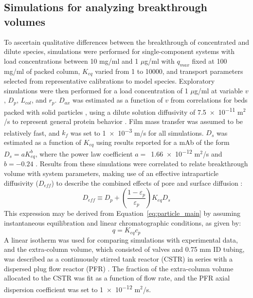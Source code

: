\documentclass[preprint,review,12pt]{elsarticle}
\begin{document}
    \subsection{Simulations for analyzing breakthrough volumes} \label{ssec:sims_explor}
        To ascertain qualitative differences between the breakthrough of concentrated and dilute species, simulations were performed for single-component systems with load concentrations between 10 mg/ml and 1 $\mu$g/ml with $q_{max}$ fixed at  100 mg/ml of packed column, $K_{eq}$ varied from 1 to 10000, and transport parameters selected from representative calibrations to model species. Exploratory simulations were then performed for a load concentration of 1 $\mu$g/ml at variable $v$, $D_p$, $L_{col}$, and $r_p$. $D_{ax}$ was estimated as a function of $v$ from correlations for beds packed with solid particles \cite{Han1985}, using a dilute solution diffusivity of \num{7.5e-11} m$^2$/s to represent general protein behavior \cite{Young1980}. Film mass transfer was assumed to be relatively fast, and $k_f$ was set to \num{1e-3} m/s for all simulations. $D_s$ was estimated as a function of $K_{eq}$ using results reported for a mAb of the form $D_s = a K_{eq}^b$, where the power law coefficient $a =$~\num{1.66e-12} m$^2$/s and $b = -0.24$ \cite{Khanal7004}. Results from these simulations were correlated to relate breakthrough volume with system parameters, making use of an effective intraparticle diffusivity ($D_{eff}$) to describe the combined effects of pore and surface diffusion \cite{Yoshida1994}:
        \begin{equation} \label{eq:d_eff}
            D_{eff} \equiv D_p + \left( \frac{1 - \varepsilon_p}{\varepsilon_p} \right) K_{eq} D_s
        \end{equation}
        This expression may be derived from Equation~\ref{eq:particle_main} by assuming instantaneous equilibration and linear chromatographic conditions, as given by:
        \begin{equation} \label{eq:linear_ss}
            q = K_{eq} c_p
        \end{equation}
        A linear isotherm was used for comparing simulations with experimental data, and the extra-column volume, which consisted of valves and 0.75 mm ID tubing, was described as a continuously stirred tank reactor (CSTR) in series with a dispersed plug flow reactor (PFR) \cite{Kumar2015}. The fraction of the extra-column volume allocated to the CSTR was fit as a function of flow rate, and the PFR axial dispersion coefficient was set to \num{1e-12} m$^2$/s.
\end{document}
